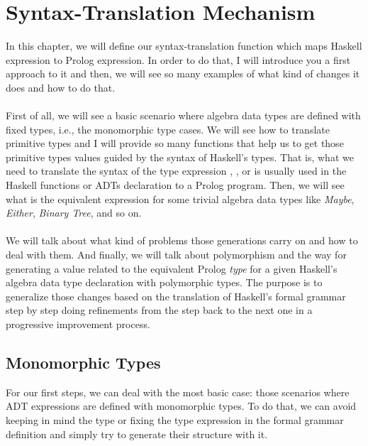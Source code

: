 \chapter{Syntax-Translation Mechanism}

In this chapter, we will define our syntax-translation function which maps Haskell expression to Prolog expression. In order to do that, I will introduce you a first approach to it and then, we will see so many examples of what kind of changes it does and how to do that.\\\\
First of all, we will see a basic scenario where algebra data types are defined with fixed types, i.e., the monomorphic type cases. We will see how to translate primitive types and I will provide so many functions that help us to get those primitive types values guided by the syntax of Haskell's types. That is, what we need to translate the syntax of the type expression , , or  is usually used in the Haskell functions or ADTs declaration to a Prolog program. Then, we will see what is the equivalent expression for some trivial algebra data types like \textit{Maybe}, \textit{Either}, \textit{Binary Tree}, and so on.\\\\
We will talk about what kind of problems those generations carry on and how to deal with them. And finally, we will talk about polymorphism and the way for generating a value related to the equivalent Prolog \textit{type} for a given Haskell's algebra data type declaration with polymorphic types. The purpose is to generalize those changes based on the translation of Haskell's formal grammar step by step doing refinements from the step back to the next one in a progressive improvement process.

\section{Monomorphic Types} \label{ch:monomorphic-types}

For our first steps, we can deal with the most basic case: those scenarios where ADT expressions are defined with monomorphic types. To do that, we can avoid keeping in mind the type or fixing the type expression in the formal grammar definition and simply try to generate their structure with it.\\

